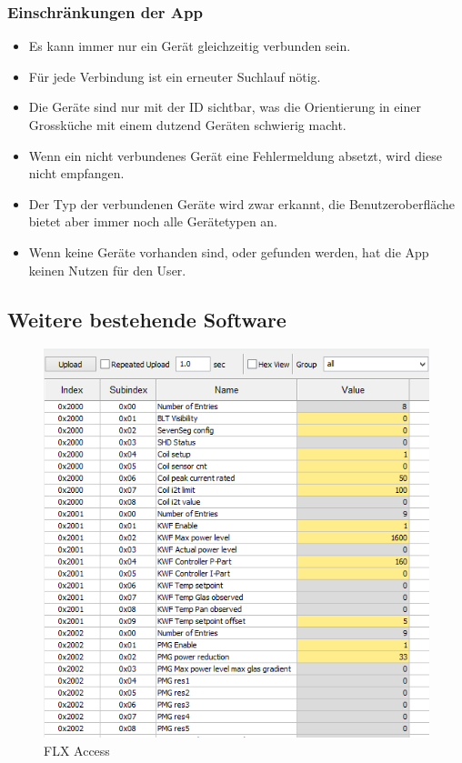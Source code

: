 \subsubsection{Einschränkungen der App}
\label{subsubsec:Einschränkungen der App}
\begin{itemize}
\item Es kann immer nur ein Gerät gleichzeitig verbunden sein.
\item Für jede Verbindung ist ein erneuter Suchlauf nötig.
\item Die Geräte sind nur mit der ID sichtbar, was die Orientierung in einer Grossküche mit einem dutzend Geräten schwierig macht.
\item Wenn ein nicht verbundenes Gerät eine Fehlermeldung absetzt, wird diese nicht empfangen.
\item Der Typ der verbundenen Geräte wird zwar erkannt, die Benutzeroberfläche bietet aber immer noch alle Gerätetypen an.
\item Wenn keine Geräte vorhanden sind, oder gefunden werden, hat die App keinen Nutzen für den User.
\end{itemize}

\WFclear
\subsection{Weitere bestehende Software}
\label{subsec:Weitere bestehende Software}

\begin{figure}
\includegraphics[scale=0.4]{analysis/res/flxaccess}
	\caption{FLX Access}
\end{figure}

